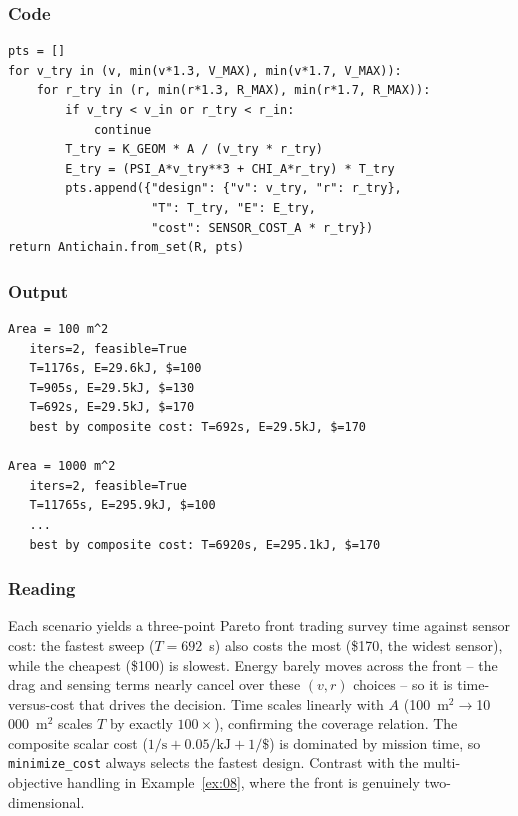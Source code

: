 \documentclass[11pt,a4paper]{article}
\begin{document}
\subsubsection*{Code}

\begin{lstlisting}
pts = []
for v_try in (v, min(v*1.3, V_MAX), min(v*1.7, V_MAX)):
    for r_try in (r, min(r*1.3, R_MAX), min(r*1.7, R_MAX)):
        if v_try < v_in or r_try < r_in:
            continue
        T_try = K_GEOM * A / (v_try * r_try)
        E_try = (PSI_A*v_try**3 + CHI_A*r_try) * T_try
        pts.append({"design": {"v": v_try, "r": r_try},
                    "T": T_try, "E": E_try,
                    "cost": SENSOR_COST_A * r_try})
return Antichain.from_set(R, pts)
\end{lstlisting}

\subsubsection*{Output}

\begin{lstlisting}[language={},numbers=none,keywordstyle={}]
Area = 100 m^2
   iters=2, feasible=True
   T=1176s, E=29.6kJ, $=100
   T=905s, E=29.5kJ, $=130
   T=692s, E=29.5kJ, $=170
   best by composite cost: T=692s, E=29.5kJ, $=170

Area = 1000 m^2
   iters=2, feasible=True
   T=11765s, E=295.9kJ, $=100
   ...
   best by composite cost: T=6920s, E=295.1kJ, $=170
\end{lstlisting}

\subsubsection*{Reading}

Each scenario yields a three-point Pareto front trading survey time
against sensor cost: the fastest sweep ($T=692$~s) also costs the most
(\$170, the widest sensor), while the cheapest (\$100) is slowest. Energy
barely moves across the front -- the drag and sensing terms nearly cancel
over these $(v,r)$ choices -- so it is time-versus-cost that drives the
decision. Time scales linearly with $A$ (100~m$^2\to$10\,000~m$^2$ scales
$T$ by exactly $100\times$), confirming the coverage relation. The
composite scalar cost ($1/\text{s}+0.05/\text{kJ}+1/\$$) is dominated by
mission time, so \texttt{minimize\_cost} always selects the fastest
design. Contrast with the multi-objective handling in
Example~\ref{ex:08}, where the front is genuinely two-dimensional.
\end{document}

